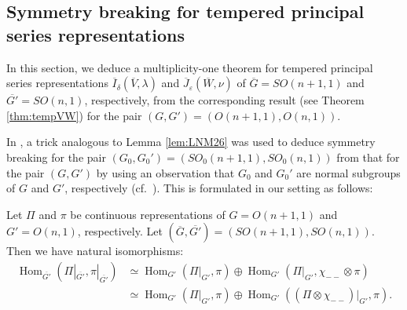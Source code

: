 \subsection{Symmetry breaking for tempered principal series representations}
\label{subsec:SOtemp}

In this section, 
 we deduce a multiplicity-one theorem 
 for tempered principal series representations 
$
   \overline I_{\delta}(\overline V, \lambda)
$
 and 
$
   \overline J_{\varepsilon}(\overline W, \nu)
$
 of $\overline G =SO(n+1,1)$ and $\overline {G'} =SO(n,1)$, 
 respectively, from the corresponding result
 (see Theorem \ref{thm:tempVW})
 for the pair $(G, G') = (O(n+1,1), O(n,1))$.  



In \cite[Chap.~2, Sect.~5]{KKP}, 
 a trick analogous to Lemma \ref{lem:LNM26} was used 
 to deduce symmetry breaking 
 for the pair $(G_0, G_0')=(SO_0(n+1,1), SO_0(n,1))$ from that 
 for the pair $(G, G')$
 by using an observation
 that $G_0$ and $G_0'$ are normal subgroups
 of $G$ and $G'$, 
 respectively
 (cf.~\cite[page 26]{KKP}).  
This is formulated in our setting as follows:
\begin{proposition}
\label{prop:LNM26}
Let $\Pi$ and $\pi$ be continuous representations
 of $G=O(n+1,1)$ and $G'=O(n,1)$, 
respectively.  
Let $(\overline G, \overline {G'})=(SO(n+1,1), SO(n,1))$.  
Then we have natural isomorphisms:
\begin{align*}
  \operatorname{Hom}_{\overline{G'}}(\Pi|_{\overline{G'}}, \pi|_{\overline{G'}})&\simeq
  \operatorname{Hom}_{G'}(\Pi|_{G'}, \pi)
  \oplus
  \operatorname{Hom}_{G'}(\Pi|_{G'}, \chi_{--}\otimes \pi)
\\
&\simeq
  \operatorname{Hom}_{G'}(\Pi|_{G'}, \pi)
  \oplus
  \operatorname{Hom}_{G'}((\Pi \otimes \chi_{--})|_{G'}, \pi).  
\end{align*}
\end{proposition}

